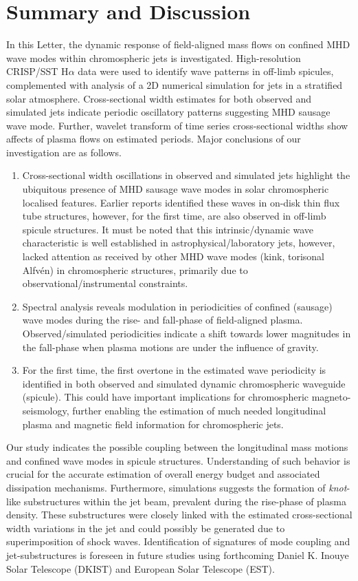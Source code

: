 \documentclass[12pt]{ociamthesis}
\begin{document}
\section{Summary and Discussion}
\label{sec:sum}
In this Letter, the dynamic response of field-aligned mass flows on confined MHD wave modes within chromospheric jets is investigated. High-resolution CRISP/SST H$\alpha$ data were used to identify wave patterns in off-limb spicules, complemented with analysis of a 2D numerical simulation for jets in a stratified solar atmosphere. Cross-sectional width estimates for both observed and simulated jets indicate periodic oscillatory patterns suggesting MHD sausage wave mode. Further, wavelet transform of time series cross-sectional widths show affects of plasma flows on estimated periods. Major conclusions of our investigation are as follows.
\begin{enumerate}[topsep=1ex]
\item{Cross-sectional width oscillations in observed and simulated jets highlight the ubiquitous presence of MHD sausage wave modes in solar chromospheric localised features. Earlier reports identified these waves in on-disk thin flux tube structures, however, for the first time, are also observed in off-limb spicule structures. It must be noted that this intrinsic/dynamic wave characteristic is well established in astrophysical/laboratory jets, however, lacked attention as received by other MHD wave modes (kink, torisonal Alfv\'en) in chromospheric structures, primarily due to observational/instrumental constraints.}

\item{Spectral analysis reveals modulation in periodicities of confined (sausage) wave modes during the rise- and fall-phase of field-aligned plasma. Observed/simulated periodicities indicate a shift towards lower magnitudes in the fall-phase when plasma motions are under the influence of gravity.}

\item{For the first time, the first overtone in the estimated wave periodicity is identified in both observed and simulated dynamic chromospheric waveguide (spicule). This could have important implications for chromospheric magneto-seismology, further enabling the estimation of much needed longitudinal plasma and magnetic field information for chromospheric jets.}
\end{enumerate}
Our study indicates the possible coupling between the longitudinal mass motions and confined wave modes in spicule structures. Understanding of such behavior is crucial for the accurate estimation of overall energy budget and associated dissipation mechanisms. Furthermore, simulations suggests the formation of \textit{knot}-like substructures within the jet beam, prevalent during the rise-phase of plasma density. These substructures were closely linked with the estimated cross-sectional width variations in the jet and could possibly be generated due to superimposition of shock waves. Identification of signatures of mode coupling and jet-substructures is foreseen in future studies using forthcoming Daniel K. Inouye Solar Telescope (DKIST) and European Solar Telescope (EST).
\end{document}
